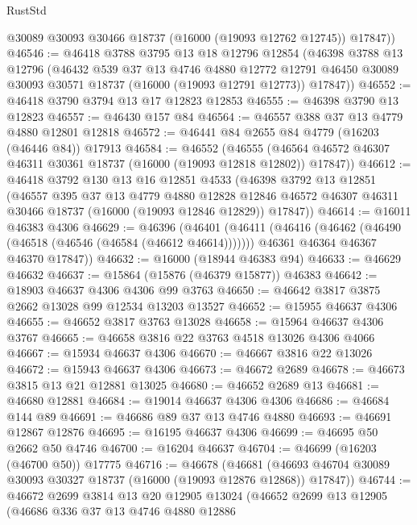 \begin{lexlean}{RustStd}
\begin{coremodule}
        @30089
        @30093
        @30466
        @18737
        (@16000 (@19093 @12762 @12745))
        @17847))
@46546 := @46418
    @3788
    @3795
    @13
    @18
    @12796
    @12854
    (@46398
      @3788
      @13
      @12796
      (@46432
        @539
        @37
        @13
        @4746
        @4880
        @12772
        @12791
        @46450
        @30089
        @30093
        @30571
        @18737
        (@16000 (@19093 @12791 @12773))
        @17847))
@46552 := @46418 @3790 @3794 @13 @17 @12823 @12853
@46555 := @46398 @3790 @13 @12823
@46557 := @46430 @157 @84
@46564 := @46557 @388 @37 @13 @4779 @4880 @12801 @12818
@46572 := @46441 @84 @2655 @84 @4779 (@16203 (@46446 @84)) @17913
@46584 := @46552
    (@46555 (@46564 @46572 @46307 @46311 @30361 @18737 (@16000 (@19093 @12818 @12802)) @17847))
@46612 := @46418
    @3792
    @130
    @13
    @16
    @12851
    @4533
    (@46398
      @3792
      @13
      @12851
      (@46557
        @395
        @37
        @13
        @4779
        @4880
        @12828
        @12846
        @46572
        @46307
        @46311
        @30466
        @18737
        (@16000 (@19093 @12846 @12829))
        @17847))
@46614 := @16011 @46383 @4306
@46629 := @46396
    (@46401
      (@46411
        (@46416 (@46462 (@46490 (@46518 (@46546 (@46584 (@46612 @46614)))))))
        @46361
        @46364
        @46367
        @46370
        @17847))
@46632 := @16000 (@18944 @46383 @94)
@46633 := @46629 @46632
@46637 := @15864 (@15876 (@46379 @15877)) @46383
@46642 := @18903 @46637 @4306 @4306 @99 @3763
@46650 := @46642 @3817 @3875 @2662 @13028 @99 @12534 @13203 @13527
@46652 := @15955 @46637 @4306
@46655 := @46652 @3817 @3763 @13028
@46658 := @15964 @46637 @4306 @3767
@46665 := @46658 @3816 @22 @3763 @4518 @13026 @4306 @4066
@46667 := @15934 @46637 @4306
@46670 := @46667 @3816 @22 @13026
@46672 := @15943 @46637 @4306
@46673 := @46672 @2689
@46678 := @46673 @3815 @13 @21 @12881 @13025
@46680 := @46652 @2689 @13
@46681 := @46680 @12881
@46684 := @19014 @46637 @4306 @4306
@46686 := @46684 @144 @89
@46691 := @46686 @89 @37 @13 @4746 @4880
@46693 := @46691 @12867 @12876
@46695 := @16195 @46637 @4306
@46699 := @46695 @50 @2662 @50 @4746
@46700 := @16204 @46637
@46704 := @46699 (@16203 (@46700 @50)) @17775
@46716 := @46678
    (@46681 (@46693 @46704 @30089 @30093 @30327 @18737 (@16000 (@19093 @12876 @12868)) @17847))
@46744 := @46672
    @2699
    @3814
    @13
    @20
    @12905
    @13024
    (@46652
      @2699
      @13
      @12905
      (@46686
        @336
        @37
        @13
        @4746
        @4880
        @12886

\end{coremodule}
\end{lexlean}
